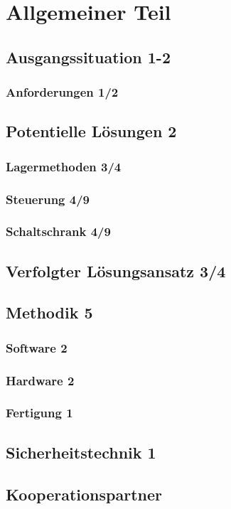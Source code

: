 \section{Allgemeiner Teil}

\subsection{Ausgangssituation 1-2}

\subsubsection{Anforderungen 1/2}



\subsection{Potentielle Lösungen 2}
\subsubsection{Lagermethoden 3/4}

\subsubsection{Steuerung 4/9}

\subsubsection{Schaltschrank 4/9}


\subsection{Verfolgter Lösungsansatz 3/4}


\subsection{Methodik 5}

\subsubsection{Software 2}

\subsubsection{Hardware 2}

\subsubsection{Fertigung 1}

\subsection{Sicherheitstechnik 1}

\subsection{Kooperationspartner}